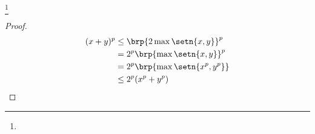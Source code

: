 \begin{proposition}
\footnote{
  }
\end{proposition}
\begin{proof}
\begin{align*}
  (x+y)^p
    &\le \brp{2\max\setn{x,y}}^p
  \\&=   2^p \brp{\max\setn{x,y}}^p
  \\&=   2^p \brp{\max\setn{x^p,y^p}}
  \\&\le 2^p(x^p + y^p)
\end{align*}
\end{proof}




